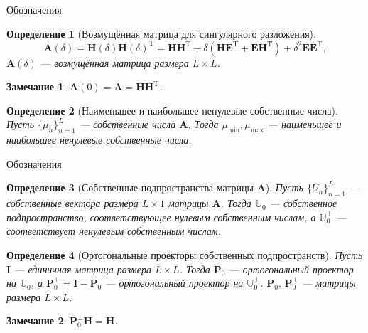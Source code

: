 \documentclass[notheorems, handout]{beamer}
\newtheorem{remark}{Замечание}
\newtheorem{definition}{Определение}
\begin{document}
	\begin{frame}{Обозначения}
		\begin{definition}[Возмущённая матрица для сингулярного разложения]
			\begin{equation*}
				\mathbf{A}(\delta) = \mathbf{H}(\delta)\mathbf{H}(\delta)^\mathrm{T} = \mathbf{HH}^\mathrm{T} + \delta(\mathbf{HE}^\mathrm{T} + \mathbf{EH}^\mathrm{T}) + \delta^2\mathbf{EE}^\mathrm{T},
			\end{equation*}
			$\mathbf{A}(\delta)$ --- возмущённая матрица размера $L\times L$.
		\end{definition}
		\begin{remark}
			$\mathbf{A}(0)=\mathbf{A}=\mathbf{HH}^\mathrm{T}$.
		\end{remark}
		\begin{definition}[Наименьшее и наибольшее ненулевые собственные числа]
			Пусть $\{\mu_n\}_{n=1}^L$ --- собственные числа $\mathbf{A}$. Тогда $\mu_{\min}, \mu_{\max}$ --- наименьшее и наибольшее ненулевые собственные числа.
		\end{definition}
	\end{frame}
	\begin{frame}{Обозначения}
		\begin{definition}[Собственные подпространства матрицы $\mathbf{A}$]
			Пусть $\{U_n\}_{n=1}^L$ --- собственные вектора размера $L\times 1$ матрицы $\mathbf{A}$. Тогда $\mathbb{U}_0$ --- собственное подпространство, соответствующее нулевым собственным числам, а $\mathbb{U}_0^\bot$ --- соответствует ненулевым собственным числам.
		\end{definition}
		\begin{definition}[Ортогональные проекторы собственных подпространств]
			Пусть $\mathbf{I}$ --- единичная матрица размера $L\times L$. Тогда $\mathbf{P}_0$ --- ортогональный проектор на $\mathbb{U}_0$, а $\mathbf{P}_0^\bot = \mathbf{I} - \mathbf{P}_0$ --- ортогональный проектор на $\mathbb{U}_0^\bot$. $\mathbf{P}_0,\,\mathbf{P}_0^\bot$ --- матрицы размера $L\times L$.
		\end{definition}
		\begin{remark}
			$\mathbf{P}_0^\bot\mathbf{H}=\mathbf{H}$.
		\end{remark}
	\end{frame}
\end{document}
